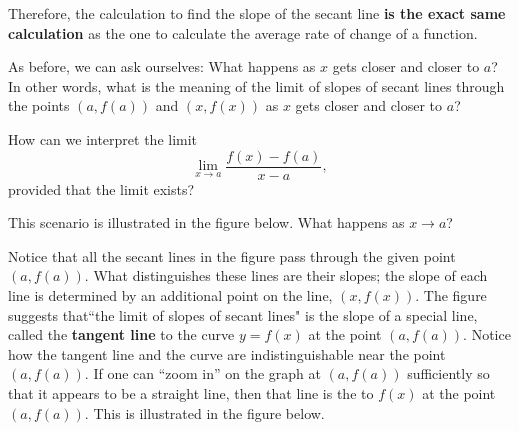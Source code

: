 \documentclass{ximera}
\begin{document}
Therefore, the calculation to find the slope of the secant line \textbf{is the exact same calculation} 
	as the one to calculate the average rate of change of a function.

As before, we can ask ourselves: What happens as $x$ gets closer and closer to $a$?
In other words, what is the meaning of the limit of slopes of secant lines through the points $(a,f(a))$ and $(x,f(x))$ 
as $x$ gets closer and closer to $a$?
   
How can we interpret the limit  
\[ \lim_{x\to a} \frac{f(x)-f(a)}{x-a}, \] 
provided that the limit exists?
    
This scenario is illustrated in the figure below. What happens as $x\to a$?
\begin{image}\end{image}

Notice that all the secant lines in the figure pass through the given point $(a,f(a))$. What distinguishes these lines are their slopes; 
	the slope of each line is determined by an additional point on the line, $(x,f(x))$. 
The figure suggests that``the limit of slopes of secant lines" is the slope of a special line, called the \textbf{tangent line} 
	to the curve $y=f(x)$ at the point $(a,f(a))$.
Notice how the tangent line and the curve are indistinguishable near the point $(a,f(a))$. If one can ``zoom in''
	on the graph at $(a, f(a))$ sufficiently so that it appears to be a straight line, then that line is the  to 
	$f(x)$ at the point $(a,f(a))$. This is illustrated in the figure below.
\end{document}

